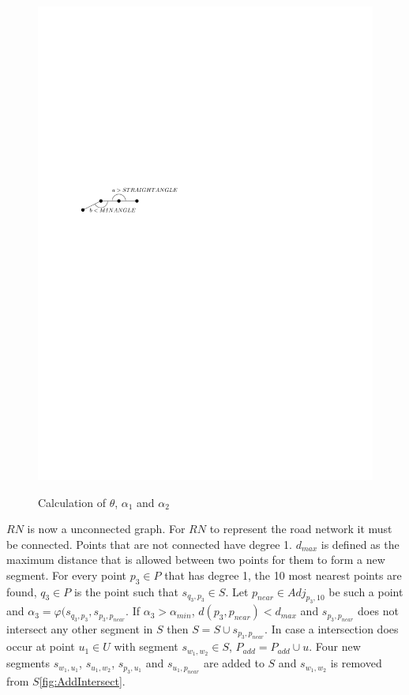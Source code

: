 \documentclass[11pt]{article}
\begin{document}
\begin{figure}[h]
\centering
  \graphicspath{ {images/}}
  \includegraphics[width=0.9\linewidth]{NetworkRemoveSegmentsDetail}
  \label{fig:NetworkRemove}
  \caption{Calculation of $\theta$, $\alpha_1$ and $\alpha_2$}
\end{figure}
  
$RN$ is now a unconnected graph. For $RN$ to represent the road network it must be connected. Points that are not connected have degree 1. $d_{max}$ is defined as the maximum distance that is allowed between two points for them to form a new segment. For every point $p_3 \in P$ that has degree 1, the 10 most nearest points are found, $q_3 \in P$ is the point such that $s_{q_3, p_3} \in S$. Let $p_{near} \in Adj_{p_3,10}$ be such a point and $\alpha_3=\varphi(s_{q_3, p_3},s_{p_3, p_{near}}$. If $\alpha_3>\alpha_{min}$, $d(p_3,p_{near})<d_{max}$ and $s_{p_3, p_{near}}$ does not intersect any other segment in $S$ then $S=S \cup s_{p_3, p_{near}}$. In case a intersection does occur at point $u_1 \in U$ with segment $s_{w_1, w_2}\in S$, $P_{add}=P_{add}\cup u$. Four new segments $s_{w_1, u_1}$, $s_{u_1, w_2}$, $s_{p_3, u_1}$ and $s_{u_1, p_{near}}$ are added to $S$ and $s_{w_1, w_2}$ is removed from $S$\ref{fig:AddIntersect}.
\end{document}
